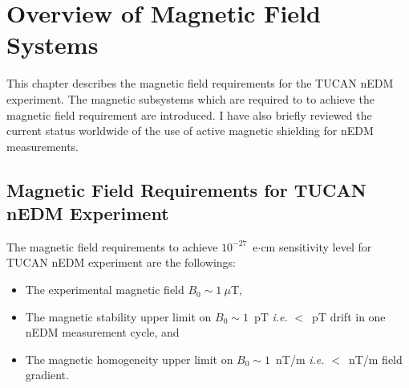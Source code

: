 \chapter{Overview of Magnetic Field Systems}\label{ch:magnetics}



This chapter describes the magnetic field requirements for the TUCAN nEDM experiment. The magnetic subsystems which are required to to achieve the magnetic field requirement are introduced. I have also briefly reviewed the current status worldwide of the use of active magnetic shielding for nEDM measurements.


\section{Magnetic Field Requirements for TUCAN nEDM Experiment}\label{sec:msr}

The magnetic field requirements to achieve $10^{-27}$~e$\cdot$cm sensitivity level for TUCAN nEDM experiment are the followings:

\begin{itemize}

    \item The experimental magnetic field $B_0\sim1~\mu$T, 
    \item The magnetic stability upper limit on $B_0\sim1$~pT {\it i.e.} $<$~pT drift in one nEDM measurement cycle, and 
    \item The magnetic homogeneity upper limit on $B_0\sim1$~nT/m {\it i.e.} $<$~nT/m field gradient. 
    
\end{itemize}





